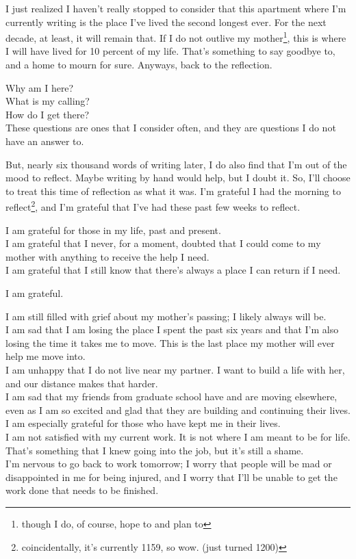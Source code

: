 \documentclass[12pt]{article}
\renewcommand{\,}{\textsuperscript{,}}
\begin{document}
I just realized I haven't really stopped to consider that this apartment where I'm currently writing is the place I've lived the second longest ever.  
For the next decade, at least, it will remain that.  
If I do not outlive my mother\footnote{though I do, of course, hope to and plan to}, this is where I will have lived for 10 percent of my life.  
That's something to say goodbye to, and a home to mourn for sure.  
Anyways, back to the reflection.

Why am I here?\\  
What is my calling?\\  
How do I get there?\\

These questions are ones that I consider often, and they are questions I do not have an answer to.

But, nearly six thousand words of writing later, I do also find that I'm out of the mood to reflect.  
Maybe writing by hand would help, but I doubt it.  
So, I'll choose to treat this time of reflection as what it was.  
I'm grateful I had the morning to reflect\footnote{coincidentally, it's currently 1159, so wow. (just turned 1200)}, and I'm grateful that I've had these past few weeks to reflect.

I am grateful for those in my life, past and present.\\  
I am grateful that I never, for a moment, doubted that I could come to my mother with anything to receive the help I need.\\  
I am grateful that I still know that there's always a place I can return if I need.

I am grateful.

I am still filled with grief about my mother's passing; I likely always will be.\\  
I am sad that I am losing the place I spent the past six years and that I'm also losing the time it takes me to move. This is the last place my mother will ever help me move into.\\  
I am unhappy that I do not live near my partner. I want to build a life with her, and our distance makes that harder.\\  
I am sad that my friends from graduate school have and are moving elsewhere, even as I am so excited and glad that they are building and continuing their lives. I am especially grateful for those who have kept me in their lives.\\  
I am not satisfied with my current work. It is not where I am meant to be for life. That's something that I knew going into the job, but it's still a shame.\\  
I'm nervous to go back to work tomorrow; I worry that people will be mad or disappointed in me for being injured, and I worry that I'll be unable to get the work done that needs to be finished.
\end{document}
